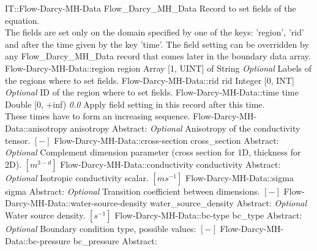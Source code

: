 \begin{RecordType}
	{IT::Flow-Darcy-MH-Data}
	{Flow{\_}Darcy{\_}MH{\_}Data}
	{} %
	{} %
	{{{Record to set fields of the equation.}\\{
The fields are set only on the domain specified by one of the keys: 'region', 'rid'}\\{
and after the time given by the key 'time'. The field setting can be overridden by}\\{
 any Flow{\_}Darcy{\_}MH{\_}Data record that comes later in the boundary data array.}}}
		\RecKey
			{Flow-Darcy-MH-Data::region}
			{region}
			{{Array [1, UINT] of }{String}}
			{ \it{Optional} }
			{{{Labels of the regions where to set fields. }}}
		\RecKey
			{Flow-Darcy-MH-Data::rid}
			{rid}
			{{Integer [0, INT]}}
			{ \it{Optional} }
			{{{ID of the region where to set fields.}}}
		\RecKey
			{Flow-Darcy-MH-Data::time}
			{time}
			{{Double [0, +inf)}}
			{ \it{0.0} }
			{{{Apply field setting in this record after this time.}\\{
These times have to form an increasing sequence.}}}
		\RecKey
			{Flow-Darcy-MH-Data::anisotropy}
			{anisotropy}
			{{Abstract}{: }}
			{ \it{Optional} }
			{{{Anisotropy of the conductivity tensor. }{$[-]$}}}
		\RecKey
			{Flow-Darcy-MH-Data::cross-section}
			{cross{\_}section}
			{{Abstract}{: }}
			{ \it{Optional} }
			{{{Complement dimension parameter (cross section for 1D, thickness for 2D). }{$[m^{3-d}]$}}}
		\RecKey
			{Flow-Darcy-MH-Data::conductivity}
			{conductivity}
			{{Abstract}{: }}
			{ \it{Optional} }
			{{{Isotropic conductivity scalar. }{$[ms^{-1}]$}}}
		\RecKey
			{Flow-Darcy-MH-Data::sigma}
			{sigma}
			{{Abstract}{: }}
			{ \it{Optional} }
			{{{Transition coefficient between dimensions. }{$[-]$}}}
		\RecKey
			{Flow-Darcy-MH-Data::water-source-density}
			{water{\_}source{\_}density}
			{{Abstract}{: }}
			{ \it{Optional} }
			{{{Water source density. }{$[s^{-1}]$}}}
		\RecKey
			{Flow-Darcy-MH-Data::bc-type}
			{bc{\_}type}
			{{Abstract}{: }}
			{ \it{Optional} }
			{{{Boundary condition type, possible values: }{$[-]$}}}
		\RecKey
			{Flow-Darcy-MH-Data::bc-pressure}
			{bc{\_}pressure}
			{{Abstract}{: }}

\end{RecordType}
